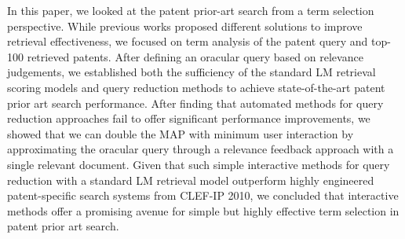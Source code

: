 In this paper, we looked at the patent prior-art search from a term
selection perspective.  While previous works proposed different
solutions to improve retrieval effectiveness, we focused on term
analysis of the patent query and top-100 retrieved patents.  After
defining an oracular query based on relevance judgements, we
established both the sufficiency of the standard LM retrieval scoring
models and query reduction methods to achieve state-of-the-art patent
prior art search performance.  After finding that automated methods
for query reduction approaches fail to offer significant performance
improvements,
we showed that we can double the MAP with minimum user interaction by
approximating the oracular query through a relevance feedback approach
with a single relevant document.  Given that such simple interactive
methods for query reduction with a standard LM retrieval model
outperform highly engineered patent-specific search systems from
CLEF-IP 2010, we concluded that interactive methods offer a promising
avenue for simple but highly effective term selection in patent prior
art search.




